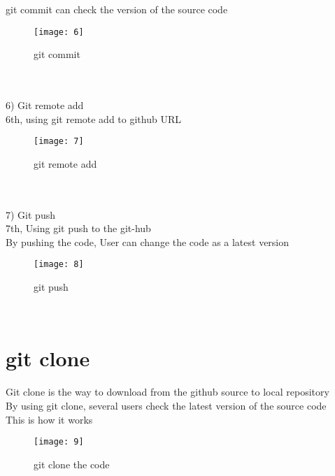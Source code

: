git commit can check the version of the source code\\
\begin{figure} [!h]
	\centering
	\texttt{[image: 6]}
	\caption{git commit}
	\label{fig:6}
\end{figure}\\
\\
6) Git remote add\\
6th, using git remote add to github URL\\
\begin{figure} [!h]
	\centering
	\texttt{[image: 7]}
	\caption{git remote add}
	\label{fig:7}
\end{figure}\\
\\
7) Git push\\
7th, Using git push to the git-hub\\
By pushing the code, User can change the code as a latest version\\
\begin{figure} [!h]
	\centering
	\texttt{[image: 8]}
	\caption{git push}
	\label{fig:8}
\end{figure}\\

\section{git clone}
Git clone is the way to download from the github source to local repository\\
By using git clone, several users check the latest version of the source code\\
This is how it works\\ 
\begin{figure} [!h]
	\centering
	\texttt{[image: 9]}
	\caption{git clone the code}
	\label{fig:9}
\end{figure}\\\\\\\\\\\\\\\\\\\\\\\\
